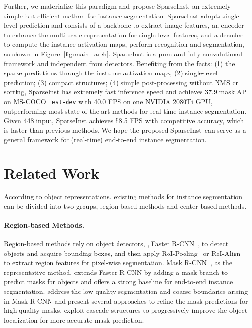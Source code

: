\documentclass[10pt,twocolumn,letterpaper]{article}
\newcommand{\name}{SparseInst}
\begin{document}
Further, we materialize this paradigm and propose \name, an extremely simple but efficient method for instance segmentation.
\name{} adopts single-level prediction and consists of a backbone to extract image features, an encoder to enhance the multi-scale representation for single-level features, and a decoder to compute the instance activation maps, perform recognition and segmentation, as shown in Figure~\ref{fig:main_arch}.
\name{} is a pure and fully convolutional framework and independent from detectors.
Benefiting from the facts: (1) the sparse predictions through the instance activation maps; (2) single-level prediction; (3) compact structures; (4) simple post-processing without NMS or sorting, \name{} has extremely fast inference speed and achieves 37.9 mask AP on MS-COCO \texttt{test-dev} with 40.0 FPS on one NVIDIA 2080Ti GPU,  outperforming most state-of-the-art methods for real-time instance segmentation. 
Given 448 input, \name{} achieves 58.5 FPS with competitive accuracy, which is faster than previous methods.
We hope the proposed \name~can serve as a general framework for (real-time) end-to-end instance segmentation.

\section{Related Work}
According to object representations, existing methods for instance segmentation can be divided into two groups, \ie region-based methods and center-based methods.
\paragraph{Region-based Methods.}
Region-based methods rely on object detectors, \eg, Faster R-CNN~\cite{FRCNNRenHG017}, to detect objects and acquire bounding boxes, and then apply RoI-Pooling~\cite{FRCNNRenHG017} or RoI-Align~\cite{MaskRCNNHeGDG17} to extract region features for pixel-wise segmentation. 
Mask R-CNN~\cite{MaskRCNNHeGDG17}, as the representative method, extends Faster R-CNN by adding a mask branch to predict masks for objects and offers a strong baseline for end-to-end instance segmentation.
\cite{PointRendKirillovWHG20,BMaskChengWH020,SegFixYuanXCW20,boundarypatchTangCLLZH21} address the low-quality segmentation and coarse boundaries arising in Mask R-CNN and present several approaches to refine the mask predictions for high-quality masks.
\cite{CascdeCaiV21,ChenPWXLSF0SOLL19} exploit cascade structures to progressively improve the object localization for more accurate mask prediction.
\end{document}

